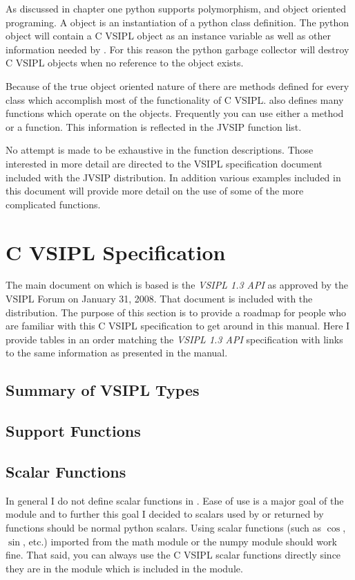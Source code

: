 As discussed in chapter one python supports polymorphism, and object oriented programing. A \pyjv object is an instantiation of a python class definition. The python object will contain a C VSIPL object as an instance variable as well as other information needed by \pyjv. For this reason the python garbage collector will destroy C VSIPL objects when no reference to the \pyjv object exists.

Because of the true object oriented nature of \pyjv there are methods defined for every class which accomplish most of the functionality of C VSIPL.  also defines many functions which operate on the \pyjv objects. Frequently you can use either a method or a function. This information is reflected in the JVSIP function list.

No attempt is made to be exhaustive in the function descriptions. Those interested in more detail are directed to the VSIPL specification document included with the JVSIP distribution. In addition various examples included in this document will provide more detail on the use of some of the more complicated functions.

\section*{C VSIPL Specification}
The main document on which  is based is the \emph{VSIPL 1.3 API} as approved by the VSIPL Forum on January 31, 2008.  That document is included with the  distribution.  The purpose of this section is to provide a roadmap for people who are familiar with this C VSIPL specification to get around in this  manual.  Here I provide tables in an order matching the \emph{VSIPL 1.3 API} specification with links to the same information as presented  in the  manual.
\subsection*{Summary of VSIPL Types}
\subsection*{Support Functions}
\subsection*{Scalar Functions}
In general I do not define scalar functions in \pyjv.  Ease of use is a major goal of the \pyjv module and to further this goal I decided to scalars used by or returned by \pyjv functions should be normal python scalars. Using scalar functions (such as $\cos$, $\sin$, etc.) imported from the math module or the numpy module should work fine. That said, you can always use the C VSIPL scalar functions directly since they are in the  module which is included in the \pyjv module.
